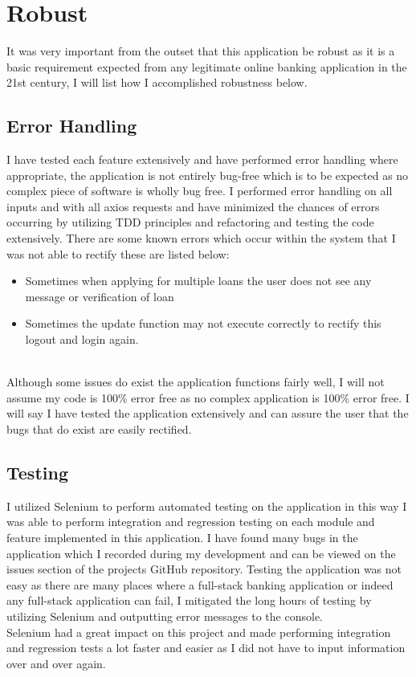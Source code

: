 \section{Robust}
It was very important from the outset that this application be robust as it is a basic requirement expected from any legitimate online banking application in the 21st century, I will list how I accomplished robustness below.
\subsection{Error Handling}
I have tested each feature extensively and have performed error handling where appropriate,
the application is not entirely bug-free which is to be expected as no complex piece of software
is wholly bug free.  I performed error handling on all inputs and with all axios requests and have
minimized the chances of errors occurring by utilizing TDD principles and refactoring and testing
the code extensively.  There are some known errors which occur within the system that I was not able to
rectify these are listed below:
\begin{itemize}
  \item Sometimes when applying for multiple loans the user does not see any message or verification of loan
  \item Sometimes the update function may not execute correctly to rectify this logout and login again.
\end{itemize}
\\
Although some issues do exist the application functions fairly well, I will not assume my code is 100\%
error free as no complex application is 100\% error free.  I will say I have tested the application extensively
and can assure the user that the bugs that do exist are easily rectified.
\subsection{Testing}
I utilized Selenium to perform automated testing on the application in this way I was able to perform
integration and regression testing on each module and feature implemented in this application.  I have
found many bugs in the application which I recorded during my development and can be viewed on the issues section
of the projects GitHub repository.  Testing the application was not easy as there are many places where a full-stack
banking application or indeed any full-stack application can fail, I mitigated the long hours of testing by utilizing
Selenium and outputting error messages to the console.
\\
Selenium had a great impact on this project and made performing integration and regression tests a lot faster and easier as I did not have to input information over and over again.
